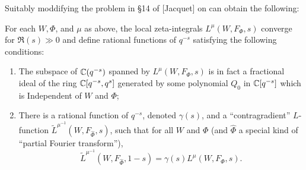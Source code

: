 Suitably moddifying the problem in \S 14 of [Jacquet] on can obtain the following:
\begin{proposition}
    For each $W, \Phi$, and $\mu$ as above, the local zeta-integrals $L^\mu(W, F_\Phi, s)$ converge for $\Re(s) \gg 0$ and define rational functions of $q^{-s}$ satisfying the following conditions:
    \begin{enumerate}[label=(\roman*)]
        \item The subspace of $\mathbb{C}(q^{-s})$ spanned by $L^\mu(W, F_\Phi, s)$ is in fact a fractional ideal of the ring $\mathbb{C}[q^{-s}, q^s]$ generated by some polynomial $Q_0$ in $\mathbb{C}[q^{-s}]$ which is Independent of $W$ and $\Phi$;
        \item There is a rational function of $q^{-s}$, denoted $\gamma(s)$, and a ``contragradient'' $L$-function $\tilde{L}^{\mu^{-1}}(W, F_{\widehat{\Phi}}, s)$, such that for all $W$ and $\Phi$ (and $\widehat{\Phi}$ a special kind of ``partial Fourier transform''),
        \[
            \tilde{L}^{\mu^{-1}}(W, F_{\widehat{\Phi}}, 1 -s) = \gamma(s) L^\mu(W, F_{\Phi}, s).
        \]
    \end{enumerate}
\end{proposition}
